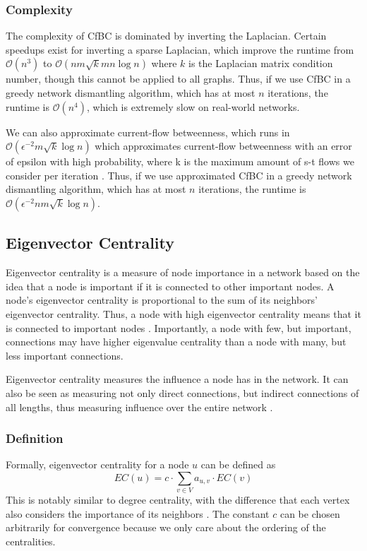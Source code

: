 \documentclass{article}
\begin{document}
\subsubsection{Complexity}
The complexity of CfBC is dominated by inverting the Laplacian. Certain speedups exist for inverting a sparse Laplacian, which improve the runtime from $\mathcal{O}(n^3)$ to $\mathcal{O}(nm  \sqrt{k} mn \log{n})$ where $k$ is the Laplacian matrix condition number, though this cannot be applied to all graphs. Thus, if we use CfBC in a greedy network dismantling algorithm, which has at most $n$ iterations, the runtime is $\mathcal{O}(n^4)$, which is extremely slow on real-world networks.

We can also approximate current-flow betweenness, which runs in $\mathcal{O}(\epsilon^{-2} m \sqrt{k} \log{n})$ which approximates current-flow betweenness with an error of epsilon with high probability, where k is the maximum amount of s-t flows we consider per iteration \cite{current}. Thus, if we use approximated CfBC in a greedy network dismantling algorithm, which has at most $n$ iterations, the runtime is $\mathcal{O}(\epsilon^{-2} nm \sqrt{k} \log{n})$.

\subsection{Eigenvector Centrality}

Eigenvector centrality is a measure of node importance in a network based on the idea that a node is important if it is connected to other important nodes. A node’s eigenvector centrality is proportional to the sum of its neighbors' eigenvector centrality. Thus, a node with high eigenvector centrality means that it is connected to important nodes \cite{bonacich}.
Importantly, a node with few, but important, connections may have higher eigenvalue centrality than a node with many, but less important connections.

Eigenvector centrality measures the influence a node has in the network. It can also be seen as measuring not only direct connections, but indirect connections of all lengths, thus measuring influence over the entire network \cite{bonacich2}.

\subsubsection{Definition}
Formally, eigenvector centrality for a node $u$ can be defined as $$ EC(u) = c \cdot \sum_{v \in V} a_{u,v} \cdot EC(v)$$ This is notably similar to degree centrality, with the difference that each vertex also considers the importance of its neighbors \cite{singh}. The constant $c$ can be chosen arbitrarily for convergence because we only care about the ordering of the centralities. 
\end{document}
